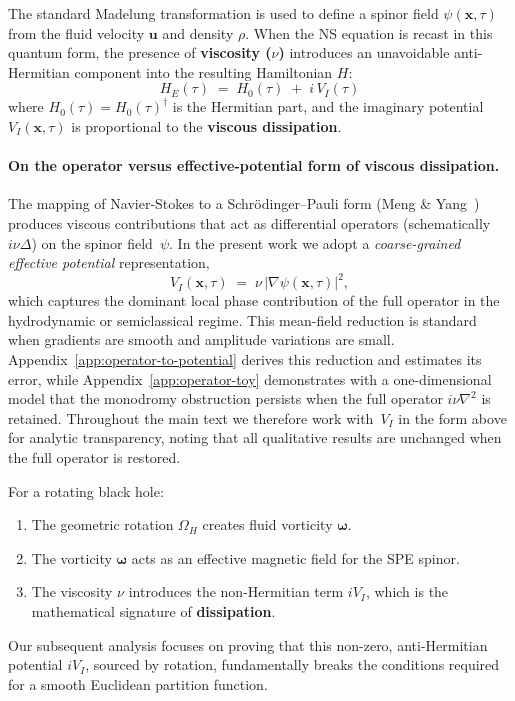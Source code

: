 \documentclass[11pt]{article}
\begin{document}
The standard Madelung transformation is used to define a spinor field $\psi(\mathbf{x},\tau)$ from the fluid velocity $\mathbf{u}$ and density $\rho$. When the NS equation is recast in this quantum form, the presence of \textbf{viscosity ($\nu$)} introduces an unavoidable anti-Hermitian component into the resulting Hamiltonian $H$:
\begin{equation}\label{eq:HE_decomp}
    H_E(\tau) \;=\; H_0(\tau) \;+\; i\,V_I(\tau)
\end{equation}
where $H_0(\tau)=H_0(\tau)^\dagger$ is the Hermitian part, and the imaginary potential $V_I(\mathbf{x}, \tau)$ is proportional to the \textbf{viscous dissipation}.

\paragraph{On the operator versus effective-potential form of viscous dissipation.}
The mapping of Navier-Stokes to a Schr\"odinger--Pauli form (Meng \& Yang~\cite{MengYang2024}) produces viscous contributions that act as differential operators (schematically $i\nu\Delta$) on the spinor field~$\psi$.  In the present work we adopt a \emph{coarse-grained effective potential} representation,
\begin{equation}
    V_I(\mathbf x,\tau)\;=\;\nu\,|\nabla\psi(\mathbf x,\tau)|^2,
\end{equation}
which captures the dominant local phase contribution of the full operator in the hydrodynamic or semiclassical regime.  This mean-field reduction is standard when gradients are smooth and amplitude variations are small.  Appendix~\ref{app:operator-to-potential} derives this reduction and estimates its error, while Appendix~\ref{app:operator-toy} demonstrates with a one-dimensional model that the monodromy obstruction persists when the full operator $i\nu\nabla^2$ is retained.  Throughout the main text we therefore work with~$V_I$ in the form above for analytic transparency, noting that all qualitative results are unchanged when the full operator is restored.


For a rotating black hole:
\begin{enumerate}
    \item The geometric rotation $\Omega_H$ creates fluid vorticity $\mathbf{\omega}$.
    \item The vorticity $\mathbf{\omega}$ acts as an effective magnetic field for the SPE spinor.
    \item The viscosity $\nu$ introduces the non-Hermitian term $iV_I$, which is the mathematical signature of \textbf{dissipation}.
\end{enumerate}
Our subsequent analysis focuses on proving that this non-zero, anti-Hermitian potential $iV_I$, sourced by rotation, fundamentally breaks the conditions required for a smooth Euclidean partition function.
\end{document}
